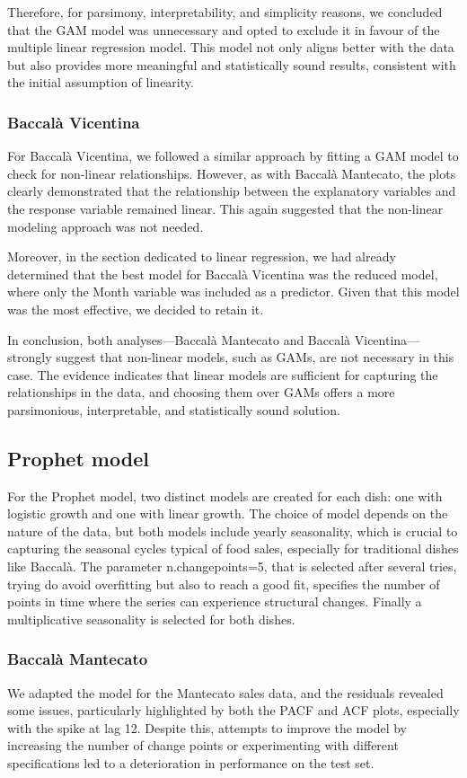 \documentclass[10pt,twocolumn,letterpaper]{article}
\begin{document}
Therefore, for parsimony, interpretability, and simplicity reasons, we concluded that the GAM model was unnecessary and opted to exclude it in favour of the multiple linear regression model. This model not only aligns better with the data but also provides more meaningful and statistically sound results, consistent with the initial assumption of linearity.

\subsubsection{Baccalà Vicentina}
For Baccalà Vicentina, we followed a similar approach by fitting a GAM model to check for non-linear relationships. However, as with Baccalà Mantecato, the plots clearly demonstrated that the relationship between the explanatory variables and the response variable remained linear. This again suggested that the non-linear modeling approach was not needed.

Moreover, in the section dedicated to linear regression, we had already determined that the best model for Baccalà Vicentina was the reduced model, where only the Month variable was included as a predictor. Given that this model was the most effective, we decided to retain it.

In conclusion, both analyses—Baccalà Mantecato and Baccalà Vicentina—strongly suggest that non-linear models, such as GAMs, are not necessary in this case. The evidence indicates that linear models are sufficient for capturing the relationships in the data, and choosing them over GAMs offers a more parsimonious, interpretable, and statistically sound solution.

\subsection{Prophet model}
For the Prophet model, two distinct models are created for each dish: one with logistic growth and one with linear growth. The choice of model depends on the nature of the data, but both models include yearly seasonality, which is crucial to capturing the seasonal cycles typical of food sales, especially for traditional dishes like Baccalà. The parameter n.changepoints=5, that is selected after several tries, trying do avoid overfitting but also to reach a good fit, specifies the number of points in time where the series can experience structural changes. Finally a multiplicative seasonality is selected for both dishes.
\subsubsection{Baccalà Mantecato}
We adapted the model for the Mantecato sales data, and the residuals revealed some issues, particularly highlighted by both the PACF and ACF plots, especially with the spike at lag 12. Despite this, attempts to improve the model by increasing the number of change points or experimenting with different specifications led to a deterioration in performance on the test set.
\end{document}
